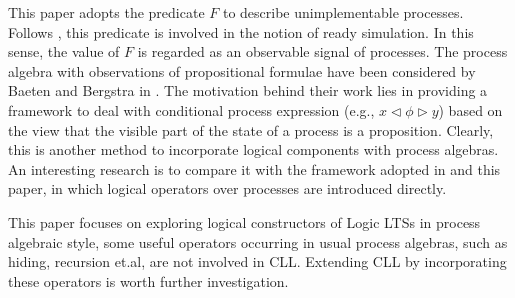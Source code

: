 \documentclass{elsarticle}
\theoremstyle{plain}
\theoremstyle{definition}
\begin{document}
This paper adopts the predicate $F$ to describe unimplementable processes.
Follows \cite{Luttgen10}, this predicate is involved in the notion of ready simulation.
In this sense, the value of $F$ is regarded as an observable signal of processes.
The process algebra with observations of propositional formulae have been considered by Baeten and Bergstra in \cite{Baeten97}.
The motivation behind their work lies in providing a framework to deal with conditional process expression (e.g., $x\triangleleft \phi \triangleright y$) based on the view that the visible part of the state of a process is a proposition.
Clearly, this is another method to incorporate logical components with process algebras.
An interesting research is to compare it with the framework adopted in \cite{Luttgen10} and this paper, in which logical operators over processes are introduced directly.

This paper focuses on exploring logical constructors of Logic LTSs in process algebraic style, some useful operators occurring in usual process algebras, such as hiding, recursion et.al, are not involved in  CLL.
Extending CLL by incorporating these operators is worth further investigation.\\
\end{document}
